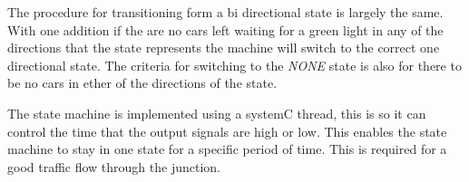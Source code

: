 The procedure for transitioning form a bi directional state is largely the same. With one addition if the are no cars left waiting for a green light in any of the directions that the state represents the machine will switch to the correct one directional state. The criteria for switching to the \emph{NONE} state is also for there to be no cars in ether of the directions of the state.

The state machine is implemented using a systemC thread, this is so it can control the time that the output signals are high or low. This enables the state machine to stay in one state for a specific period of time. This is required for a good traffic flow through the junction.
